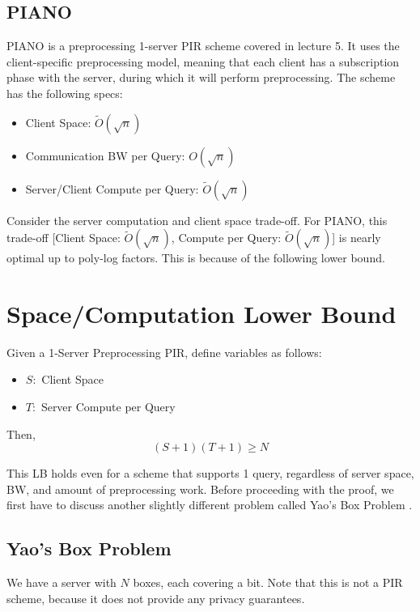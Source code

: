 \subsection{PIANO}
PIANO\cite{piano} is a preprocessing 1-server PIR scheme covered in lecture 5. It uses the client-specific preprocessing model, meaning that each client has a subscription phase with the server, during which it will perform preprocessing. The scheme has the following specs:
\begin{itemize}
    \item Client Space: $\widetilde{O}(\sqrt{n})$
    \item Communication BW per Query: $O(\sqrt{n})$
    \item Server/Client Compute per Query: $\widetilde{O}(\sqrt{n})$
\end{itemize}

Consider the server computation and client space trade-off. For PIANO, this trade-off [Client Space: $\widetilde{O}(\sqrt{n})$, Compute per Query: $\widetilde{O}(\sqrt{n})$] is nearly optimal up to poly-log factors. This is because of the following lower bound.

\section{Space/Computation Lower Bound}
\begin{claim}
    Given a 1-Server Preprocessing PIR, define variables as follows:

    \begin{itemize}
        \item $S:$ Client Space
        \item $T:$ Server Compute per Query
    \end{itemize}

    Then, 
    \[(S+1)(T+1) \ge N\]
\end{claim}


This LB holds even for a scheme that supports 1 query, regardless of server space, BW, and amount of preprocessing work. Before proceeding with the proof, we first have to discuss another slightly different problem called Yao's Box Problem \cite{yao}.

\subsection{Yao's Box Problem}
We have a server with $N$ boxes, each covering a bit. Note that this is not a PIR scheme, because it does not provide any privacy guarantees.

